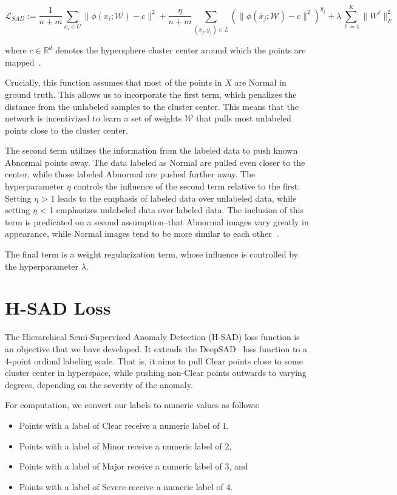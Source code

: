 \documentclass{article}
\begin{document}
\[\mathcal{L}_{SAD} := \frac{1}{n + m}\sum_{x_i \in U}{\|\phi(x_i;\mathcal{W}) - c\|^2} + \frac{\eta}{n + m}\sum_{(\tilde{x_j}, y_j) \in L}{(\|\phi(\tilde{x_j};\mathcal{W}) - c\|^{2})^{y_j}} + \lambda\sum_{\ell = 1}^{K}{\|W^{\ell}\|^2_F}\]

where $c \in \mathbb{R}^d$ denotes the hypersphere cluster center around which the points are mapped~\cite{ruff2019deep}.

Crucially, this function assumes that most of the points in $X$ are Normal in ground truth. This allows us to incorporate the first term, which penalizes the distance from the unlabeled samples to the cluster center. This means that the network is incentivized to learn a set of weights $\mathcal{W}$ that pulls most unlabeled points close to the cluster center. 

The second term utilizes the information from the labeled data to push known Abnormal points away. The data labeled as Normal are pulled even closer to the center, while those labeled Abnormal are pushed further away. The hyperparameter $\eta$ controls the influence of the second term relative to the first. Setting $\eta$ > 1 leads to the emphasis of labeled data over unlabeled data, while setting $\eta$ < 1 emphasizes unlabeled data over labeled data. The inclusion of this term is predicated on a second assumption--that Abnormal images vary greatly in appearance, while Normal images tend to be more similar to each other~\cite{ruff2019deep}. 

The final term is a weight regularization term, whose influence is controlled by the hyperparameter $\lambda$.

\section{\ac{H-SAD} Loss}
\label{app:hsad}

The Hierarchical Semi-Supervised Anomaly Detection (\ac{H-SAD}) loss function is an objective that we have developed. It extends the \ac{DeepSAD}~\cite{ruff2019deep} loss function to a 4-point ordinal labeling scale. That is, it aims to pull Clear points close to some cluster center in hyperspace, while pushing non-Clear points outwards to varying degrees, depending on the severity of the anomaly. 

For computation, we convert our labels to numeric values as follows:
\begin{itemize}
\item Points with a label of Clear receive a numeric label of 1,
\item Points with a label of Minor receive a numeric label of 2,
\item Points with a label of Major receive a numeric label of 3, and
\item Points with a label of Severe receive a numeric label of 4.
\end{itemize}
\end{document}
